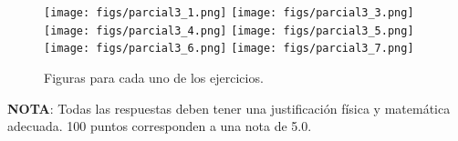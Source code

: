 \documentclass[letterpaper,10pt,onecolumn]{article}
\begin{document}
\begin{figure}[!h]
\begin{center}
\texttt{[image: figs/parcial3\_1.png]}
\texttt{[image: figs/parcial3\_3.png]}
\texttt{[image: figs/parcial3\_4.png]}
\texttt{[image: figs/parcial3\_5.png]}
\texttt{[image: figs/parcial3\_6.png]}
\texttt{[image: figs/parcial3\_7.png]}
\caption{Figuras para cada uno de los ejercicios.}
\end{center}
\end{figure}
{\small {\bf NOTA}: Todas las respuestas deben tener una justificaci\'on
f\'isica y matem\'atica adecuada. 100 puntos corresponden a una nota
de 5.0.}
\end{document}
